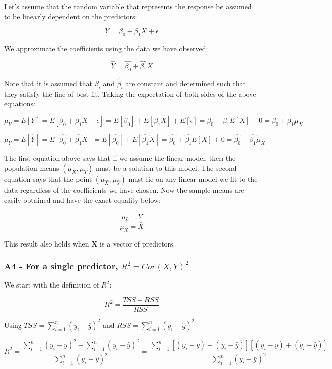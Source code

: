 \documentclass[11pt]{article}
\begin{document}
Let's assume that the random variable that represents the response be
assumed to be linearly dependent on the predictors:

\[Y = \beta_0 + \beta_1 X + \epsilon\]

We approximate the coefficients using the data we have observed:

\[\hat{Y} = \hat{\beta_0} + \hat{\beta_1} X\]

Note that it is assumed that \(\beta_i\) and \(\hat{\beta}_i\) are
constant and determined such that they satisfy the line of best fit.
Taking the expectation of both sides of the above equations:

\[\mu_Y = E[Y] = E[\beta_0 + \beta_1 X + \epsilon] = E[\beta_0] + E[\beta_1 X] + E[\epsilon] = \beta_0 + \beta_1 E[X] + 0 = \beta_0 + \beta_1 \mu_X\]

\[\mu_{\hat{Y}} = E[\hat{Y}] = E[\hat{\beta_0} + \hat{\beta_1} X] = E[\hat{\beta_0}] + E[\hat{\beta_1} X] = \hat{\beta_0} + \hat{\beta_1} E[X] + 0 = \hat{\beta_0} + \hat{\beta_1} \mu_{\hat{X}}\]

The first equation above says that if we assume the linear model, then
the population means \((\mu_X,\mu_Y)\) must be a solution to this model.
The second equation says that the point
\((\mu_{\hat{X}},\mu_{\hat{Y}})\) must lie on any linear model we fit to
the data regardless of the coefficients we have chosen. Now the sample
means are easily obtained and have the exact equality below:

\[\mu_{\hat{Y}} = \bar{Y}\] \[\mu_{\hat{X}} = \bar{X}\]

This result also holds when \(\boldsymbol{X}\) is a vector of
predictors.

    \hypertarget{a4---for-a-single-predictor-r2-corxy2}{%
\subsubsection{\texorpdfstring{A4 - For a single predictor,
\(R^2 = Cor(X,Y)^2\)}{A4 - For a single predictor, R\^{}2 = Cor(X,Y)\^{}2}}\label{a4---for-a-single-predictor-r2-corxy2}}

We start with the definition of \(R^2\):

\[R^2 = \frac{ TSS - RSS }{ RSS }\]

Using \(TSS = \sum_{i=1}^n (y_i - \bar{y})^2\) and
\(RSS = \sum_{i=1}^n (y_i - \hat{y})^2\)

\[R^2 = \frac{ \sum_{i=1}^n (y_i - \bar{y})^2 - \sum_{i=1}^n (y_i - \hat{y})^2 }{ \sum_{i=1}^n (y_i - \hat{y})^2 } = \frac{ \sum_{i=1}^n [ (y_i - \bar{y}) - (y_i - \hat{y}) ][ (y_i - \bar{y}) + (y_i - \hat{y}) ] }{ \sum_{i=1}^n (y_i - \bar{y})^2 }\]
\end{document}
